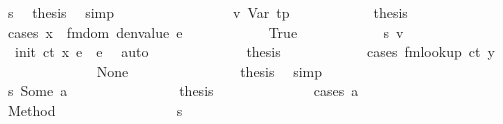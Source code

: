 \begin{isabellebody}
\ s{}\ \isamarkupfalse%
\ {\isacharquery}{\kern0pt}thesis\ \isamarkupfalse%
\ simp\isanewline
\ \ \ \ \ \ \isamarkupfalse%
\isanewline
\ \ \ \ \ \ \ \ \isamarkupfalse%
\ v{}{\isacharcolon}{\kern0pt}\ {\isacharparenleft}{\kern0pt}Var\ tp{\isacharparenright}{\kern0pt}\isanewline
\ \ \ \ \ \ \ \ \isamarkupfalse%
\ \isamarkupfalse%
\ {\isacharquery}{\kern0pt}thesis\isanewline
\ \ \ \ \ \ \ \ \isamarkupfalse%
\ {\isacharparenleft}{\kern0pt}cases\ {\isachardoublequoteopen}x\ {\isacharbar}{\kern0pt}{\isasymin}{\isacharbar}{\kern0pt}\ fmdom\ {\isacharparenleft}{\kern0pt}denvalue\ e{\isacharparenright}{\kern0pt}{\isachardoublequoteclose}{\isacharparenright}{\kern0pt}\isanewline
\ \ \ \ \ \ \ \ \ \ \isamarkupfalse%
\ True\isanewline
\ \ \ \ \ \ \ \ \ \ \isamarkupfalse%
\ s{}\ v{}\ \isamarkupfalse%
\ {\isacharasterisk}{\kern0pt}{\isacharcolon}{\kern0pt}\ {\isachardoublequoteopen}init\ ct\ x\ e\ {\isacharequal}{\kern0pt}\ e{\isachardoublequoteclose}\ \isamarkupfalse%
\ auto\isanewline
\ \ \ \ \ \ \ \ \ \ \isamarkupfalse%
\ \isamarkupfalse%
\ {\isacharquery}{\kern0pt}thesis\isanewline
\ \ \ \ \ \ \ \ \ \ \isamarkupfalse%
\ {\isacharparenleft}{\kern0pt}cases\ {\isachardoublequoteopen}fmlookup\ ct\ y{\isachardoublequoteclose}{\isacharparenright}{\kern0pt}\isanewline
\ \ \ \ \ \ \ \ \ \ \ \ \isamarkupfalse%
\ None\isanewline
\ \ \ \ \ \ \ \ \ \ \ \ \isamarkupfalse%
\ \isamarkupfalse%
\ {\isacharquery}{\kern0pt}thesis\ \isamarkupfalse%
\ simp\isanewline
\ \ \ \ \ \ \ \ \ \ \isamarkupfalse%
\isanewline
\ \ \ \ \ \ \ \ \ \ \ \ \isamarkupfalse%
\ s{}{\isacharcolon}{\kern0pt}\ {\isacharparenleft}{\kern0pt}Some\ a{\isacharparenright}{\kern0pt}\isanewline
\ \ \ \ \ \ \ \ \ \ \ \ \isamarkupfalse%
\ \isamarkupfalse%
\ {\isacharquery}{\kern0pt}thesis\isanewline
\ \ \ \ \ \ \ \ \ \ \ \ \isamarkupfalse%
\ {\isacharparenleft}{\kern0pt}cases\ a{\isacharparenright}{\kern0pt}\isanewline
\ \ \ \ \ \ \ \ \ \ \ \ \ \ \isamarkupfalse%
\ {\isacharparenleft}{\kern0pt}Method\ {\isacharunderscore}{\kern0pt}{\isacharparenright}{\kern0pt}\isanewline
\ \ \ \ \ \ \ \ \ \ \ \ \ \ \isamarkupfalse%
\ s{}\ \isamarkupfalse%

\end{isabellebody}
